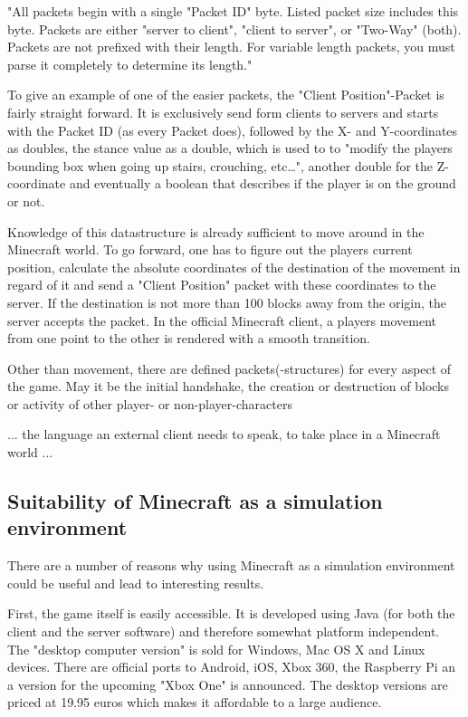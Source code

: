 "All packets begin with a single "Packet ID" byte. Listed packet size includes this byte. Packets are either "server to client", "client to server", or "Two-Way" (both). Packets are not prefixed with their length. For variable length packets, you must parse it completely to determine its length." 

To give an example of one of the easier packets, the "Client Position"-Packet is fairly straight forward. It is exclusively send form clients to servers and starts with the Packet ID (as every Packet does), followed by the X- and Y-coordinates as doubles, the stance value as a double, which is used to to "modify the players bounding box when going up stairs, crouching, etc…", another double for the Z-coordinate and eventually a boolean that describes if the player is on the ground or not.~\cite{protocol}

Knowledge of this datastructure is already sufficient to move around in the Minecraft world. To go forward, one has to figure out the players current position, calculate the absolute coordinates of the destination of the movement in regard of it and send a "Client Position" packet with these coordinates to the server. If the destination is not more than 100 blocks away from the origin, the server accepts the packet. In the official Minecraft client, a players movement from one point to the other is rendered with a smooth transition.

Other than movement, there are defined packets(-structures) for every aspect of the game. May it be the initial handshake, the creation or destruction of blocks or activity of other player- or non-player-characters

... the language an external client needs to speak, to take place in a Minecraft world ...

        \subsection{Suitability of Minecraft as a simulation environment}
There are a number of reasons why using Minecraft as a simulation environment could be useful and lead to interesting results.

First, the game itself is easily accessible. It is developed using Java (for both the client and the server software) and therefore somewhat platform independent. The "desktop computer version" is sold for Windows, Mac OS X and Linux devices. There are official ports to Android, iOS, Xbox 360, the Raspberry Pi an a version for the upcoming "Xbox One" is announced. The desktop versions are priced at 19.95 euros  which makes it affordable to a large audience.

